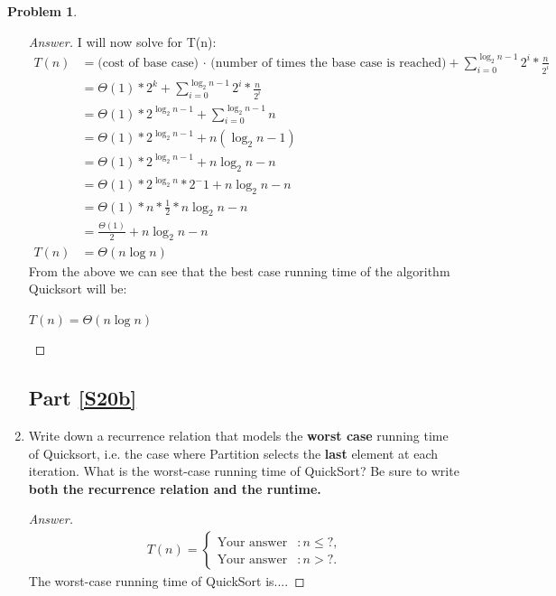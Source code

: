 \documentclass[11pt]{article}
\theoremstyle{definition}
\theoremstyle{definition}
\newtheorem{required}{Problem}
\theoremstyle{definition}
\begin{document}
\begin{required}
\begin{enumerate}[label=(\alph*)]
\begin{proof}[Answer]
I will now solve for T(n): \\
\begin{align*}
T(n) &= \textrm{(cost of base case) · (number of times the base case is reached)} + \sum_{i=0}^{\log_2 n - 1}  2^{i} * \frac{n}{2^i} \\
&= \Theta(1) * 2^k +  \sum_{i=0}^{\log_2 n - 1}  2^{i} * \frac{n}{2^i} \\
&= \Theta(1) * 2^{\log_2 n-1} + \sum_{i=0}^{\log_2 n - 1}  n \\
&= \Theta(1) * 2^{\log_2 n-1} + n(\log_2 n - 1) \\
&= \Theta(1) * 2^{\log_2 n-1} + n\log_2 n - n \\
&= \Theta(1) * 2^{\log_2 n} * 2^-1 + n\log_2 n - n \\
&= \Theta(1) * n * \frac{1}{2} *  n\log_2 n - n \\
&= \frac{\Theta(1)}{2} + n\log_2 n - n \\
T(n) &= \Theta(n\log n)
\end{align*}
From the above we can see that the best case running time of the algorithm Quicksort will be: \\
\begin{center}
$T(n) = \Theta(n\log n)$
\end{center}
\end{proof}


\newpage 
\subsection{Part \ref{S20b}}
\item \label{S20b} Write down a recurrence relation that models the {\bf worst case} running time of Quicksort, i.e. the case where {\sc Partition} selects the {\bf last} element at each iteration. What is the worst-case running time of QuickSort? Be sure to write \textbf{both the recurrence relation and the runtime.}

\begin{proof}[Answer]
\begin{align*}
T(n) = \begin{cases}
\text{Your answer} & : n \leq ?, \\
\text{Your answer} & : n > ?.
\end{cases}
\end{align*}
The worst-case running time of QuickSort is.... %
\end{proof}




\end{enumerate}
\end{required}
\end{document}
